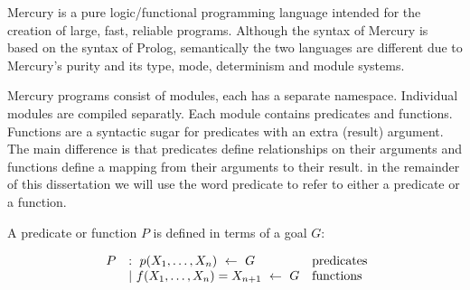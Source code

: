 

Mercury is a pure logic/functional programming language
intended for the creation of large, fast, reliable programs.
Although the syntax of Mercury is based on the syntax of Prolog,
semantically the two languages are different
due to Mercury's purity and its type, mode, determinism and module systems.

Mercury programs consist of modules,
each has a separate namespace.
Individual modules are compiled separatly.
Each module contains predicates and functions.
Functions are a syntactic sugar for predicates with an extra (result)
argument.
The main difference is that
predicates define relationships on their arguments and
functions define a mapping from their arguments to their result.
in the remainder of this dissertation we will use the word predicate to refer to
either a predicate or a function.

A predicate or function $P$ is defined in terms of a goal $G$:

$$
\begin{array}{lll}
~P
    & :~ p(X_1, \ldots, X_n)~\leftarrow~G
        & \hbox{predicates} \\
    & |~ f(X_1, \ldots, X_n)=X_{n+1}~\leftarrow~G
        & \hbox{functions} \\
\end{array}
$$


